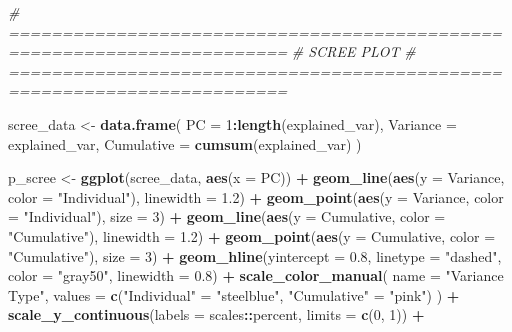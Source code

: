 \documentclass[
]{article}
\newenvironment{Shaded}{\begin{snugshade}}{\end{snugshade}}
\newcommand{\AttributeTok}[1]{\textcolor[rgb]{0.13,0.29,0.53}{#1}}
\newcommand{\CommentTok}[1]{\textcolor[rgb]{0.56,0.35,0.01}{\textit{#1}}}
\newcommand{\DecValTok}[1]{\textcolor[rgb]{0.00,0.00,0.81}{#1}}
\newcommand{\FloatTok}[1]{\textcolor[rgb]{0.00,0.00,0.81}{#1}}
\newcommand{\FunctionTok}[1]{\textcolor[rgb]{0.13,0.29,0.53}{\textbf{#1}}}
\newcommand{\NormalTok}[1]{#1}
\newcommand{\OtherTok}[1]{\textcolor[rgb]{0.56,0.35,0.01}{#1}}
\newcommand{\SpecialCharTok}[1]{\textcolor[rgb]{0.81,0.36,0.00}{\textbf{#1}}}
\newcommand{\StringTok}[1]{\textcolor[rgb]{0.31,0.60,0.02}{#1}}
\begin{document}
\begin{Shaded}
\begin{Highlighting}[]
  \CommentTok{\# ========================================================================}
  \CommentTok{\# SCREE PLOT}
  \CommentTok{\# ========================================================================}
  
\NormalTok{  scree\_data }\OtherTok{\textless{}{-}} \FunctionTok{data.frame}\NormalTok{(}
    \AttributeTok{PC =} \DecValTok{1}\SpecialCharTok{:}\FunctionTok{length}\NormalTok{(explained\_var),}
    \AttributeTok{Variance =}\NormalTok{ explained\_var,}
    \AttributeTok{Cumulative =} \FunctionTok{cumsum}\NormalTok{(explained\_var)}
\NormalTok{  )}
  
\NormalTok{  p\_scree }\OtherTok{\textless{}{-}} \FunctionTok{ggplot}\NormalTok{(scree\_data, }\FunctionTok{aes}\NormalTok{(}\AttributeTok{x =}\NormalTok{ PC)) }\SpecialCharTok{+}
    \FunctionTok{geom\_line}\NormalTok{(}\FunctionTok{aes}\NormalTok{(}\AttributeTok{y =}\NormalTok{ Variance, }\AttributeTok{color =} \StringTok{"Individual"}\NormalTok{), }\AttributeTok{linewidth =} \FloatTok{1.2}\NormalTok{) }\SpecialCharTok{+}
    \FunctionTok{geom\_point}\NormalTok{(}\FunctionTok{aes}\NormalTok{(}\AttributeTok{y =}\NormalTok{ Variance, }\AttributeTok{color =} \StringTok{"Individual"}\NormalTok{), }\AttributeTok{size =} \DecValTok{3}\NormalTok{) }\SpecialCharTok{+}
    \FunctionTok{geom\_line}\NormalTok{(}\FunctionTok{aes}\NormalTok{(}\AttributeTok{y =}\NormalTok{ Cumulative, }\AttributeTok{color =} \StringTok{"Cumulative"}\NormalTok{), }\AttributeTok{linewidth =} \FloatTok{1.2}\NormalTok{) }\SpecialCharTok{+}
    \FunctionTok{geom\_point}\NormalTok{(}\FunctionTok{aes}\NormalTok{(}\AttributeTok{y =}\NormalTok{ Cumulative, }\AttributeTok{color =} \StringTok{"Cumulative"}\NormalTok{), }\AttributeTok{size =} \DecValTok{3}\NormalTok{) }\SpecialCharTok{+}
    \FunctionTok{geom\_hline}\NormalTok{(}\AttributeTok{yintercept =} \FloatTok{0.8}\NormalTok{, }\AttributeTok{linetype =} \StringTok{"dashed"}\NormalTok{, }\AttributeTok{color =} \StringTok{"gray50"}\NormalTok{, }\AttributeTok{linewidth =} \FloatTok{0.8}\NormalTok{) }\SpecialCharTok{+}
    \FunctionTok{scale\_color\_manual}\NormalTok{(}
      \AttributeTok{name =} \StringTok{"Variance Type"}\NormalTok{,}
      \AttributeTok{values =} \FunctionTok{c}\NormalTok{(}\StringTok{"Individual"} \OtherTok{=} \StringTok{"steelblue"}\NormalTok{, }\StringTok{"Cumulative"} \OtherTok{=} \StringTok{"pink"}\NormalTok{)}
\NormalTok{    ) }\SpecialCharTok{+}
    \FunctionTok{scale\_y\_continuous}\NormalTok{(}\AttributeTok{labels =}\NormalTok{ scales}\SpecialCharTok{::}\NormalTok{percent, }\AttributeTok{limits =} \FunctionTok{c}\NormalTok{(}\DecValTok{0}\NormalTok{, }\DecValTok{1}\NormalTok{)) }\SpecialCharTok{+}

\end{Highlighting}
\end{Shaded}
\end{document}
